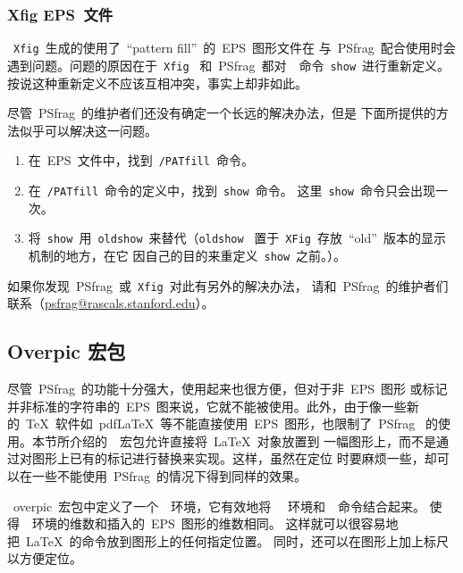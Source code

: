 \subsubsection{Xfig EPS~文件}\label{sssec:xfigfile}

~\texttt{Xfig}~生成的使用了~``pattern fill''~的~EPS~图形文件在
与~\textsf{PSfrag}~配合使用时会遇到问题。问题的原因在于~\texttt{Xfig}~
和~\textsf{PSfrag}~都对~\PS~命令~\texttt{show}~进行重新定义。
按说这种重新定义不应该互相冲突，事实上却非如此。

尽管~\textsf{PSfrag}~的维护者们还没有确定一个长远的解决办法，但是
下面所提供的方法似乎可以解决这一问题。
\begin{enumerate}
\item 在~EPS~文件中，找到~\texttt{/PATfill}~命令。
\item 在~\texttt{/PATfill}~命令的定义中，找到~\texttt{show}~命令。
      这里~\texttt{show}~命令只会出现一次。
\item 将~\texttt{show}~用~\texttt{oldshow}~来替代（\texttt{oldshow}~
      置于~\texttt{XFig}~存放~``old''~版本的显示机制的地方，在它
      因自己的目的来重定义~\texttt{show}~之前。）。
\end{enumerate}
如果你发现~\textsf{PSfrag}~或~\texttt{Xfig}~对此有另外的解决办法，
请和~\textsf{PSfrag}~的维护者们联系（\href{mailto:psfrag@rascals.stanford.edu}%
{psfrag@rascals.stanford.edu}）。

\subsection{Overpic 宏包}\label{ssec:overpic}

尽管~\textsf{PSfrag}~的功能十分强大，使用起来也很方便，但对于非~EPS~图形
或标记并非标准的字符串的~EPS~图来说，它就不能被使用。此外，由于像一些新
的~\TeX{}~软件如~pdf\LaTeX{}~等不能直接使用~EPS~图形，也限制了~\textsf{PSfrag}~
的使用。本节所介绍的~~宏包允许直接将~\LaTeX{}~对象放置到
一幅图形上，而不是通过对图形上已有的标记进行替换来实现。这样，虽然在定位
时要麻烦一些，却可以在一些不能使用~\textsf{PSfrag}~的情况下得到同样的效果。

~\textsf{overpic}~宏包中定义了一个~~环境，它有效地将
~~环境和~~命令结合起来。
使得~~环境的维数和插入的~EPS~图形的维数相同。
这样就可以很容易地把~\LaTeX{}~的命令放到图形上的任何指定位置。
同时，还可以在图形上加上标尺以方便定位。



